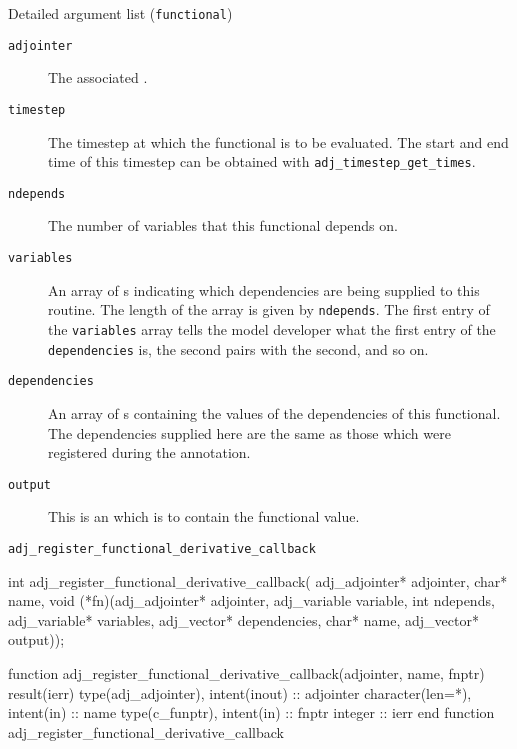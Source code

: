 \begin{boxwithtitle}{Detailed argument list (\texttt{functional})}
\begin{description}
\item[\texttt{adjointer}] The associated .
\item[\texttt{timestep}] The timestep at which the functional is to be evaluated. The start and end time of this timestep can be obtained with \texttt{adj_timestep_get_times}.
\item[\texttt{ndepends}] The number of variables that this functional depends on.
\item[\texttt{variables}] An array of s indicating which dependencies are being supplied to this routine. The length of the
array is given by \texttt{ndepends}. The first entry of the \texttt{variables} array
tells the model developer what the first entry of the \texttt{dependencies} is, the second pairs with the second, and so on.
\item[\texttt{dependencies}] An array of s containing the values of the dependencies of this functional. The dependencies supplied
here are the same as those which were registered during the annotation.
\item[\texttt{output}] This is an  which is to contain the functional value. 
\end{description}
\end{boxwithtitle}


\begin{boxwithtitle}{\texttt{adj_register_functional_derivative_callback}}
\begin{minipage}{\columnwidth}
\begin{ccode}
int adj_register_functional_derivative_callback(
                    adj_adjointer* adjointer, char* name, 
                    void (*fn)(adj_adjointer* adjointer, 
                               adj_variable variable, int ndepends, 
                               adj_variable* variables, adj_vector* dependencies, 
                               char* name, adj_vector* output));
\end{ccode}
\begin{fortrancode}
function adj_register_functional_derivative_callback(adjointer, name, fnptr) 
                                                                      result(ierr)
  type(adj_adjointer), intent(inout) :: adjointer
  character(len=*), intent(in) :: name
  type(c_funptr), intent(in) :: fnptr
  integer :: ierr
end function adj_register_functional_derivative_callback
\end{fortrancode}
\end{minipage}
\end{boxwithtitle}

